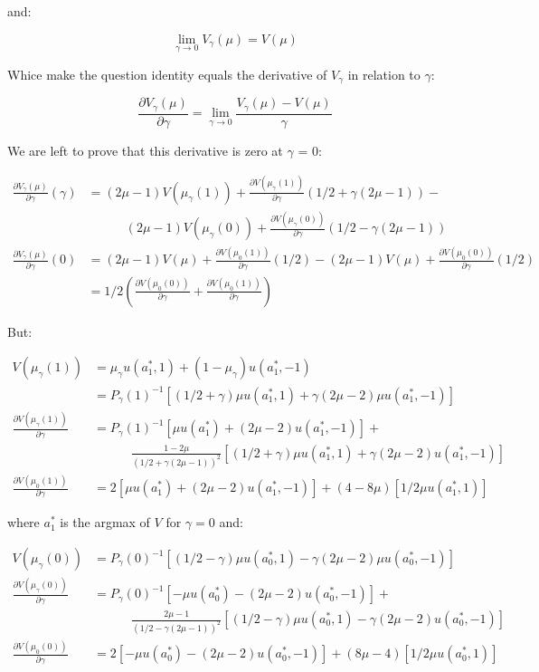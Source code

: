 \documentclass{article}
\begin{document}
and:

\[
  \lim_{\gamma \to 0} V_\gamma(\mu) = V(\mu)
\]

Whice make the question identity equals the derivative of $V_\gamma$ in relation
to $\gamma$:

\[
\frac{\partial V_\gamma(\mu)}{\partial \gamma} =
\lim_{\gamma \to 0} \frac{V_\gamma(\mu) - V(\mu)}{\gamma}
\]

We are left to prove that this derivative is zero at $\gamma$ = 0:

\[
\begin{split}
  \frac{\partial V_\gamma(\mu)}{\partial \gamma}(\gamma) & =
    (2\mu -1)V(\mu_\gamma(1)) +
    \frac{\partial V(\mu_\gamma(1))}{\partial \gamma}(1/2 + \gamma(2\mu - 1)) - \\
    & \qquad\quad
    (2\mu -1)V(\mu_\gamma(0)) +
    \frac{\partial V(\mu_\gamma(0))}{\partial \gamma}(1/2 - \gamma(2\mu - 1)) \\
  \frac{\partial V_\gamma(\mu)}{\partial \gamma}(0) & =
    (2\mu -1)V(\mu) +
    \frac{\partial V(\mu_0(1))}{\partial \gamma}(1/2) -
    (2\mu -1)V(\mu) +
    \frac{\partial V(\mu_0(0))}{\partial \gamma}(1/2) \\
  & =
    1/2 \left(\frac{\partial V(\mu_0(0))}{\partial \gamma} +
      \frac{\partial V(\mu_0(1))}{\partial \gamma}\right)
\end{split}
\]

But:

\[
\begin{split}
  V(\mu_\gamma(1)) & = \mu_\gamma u(a_1^*, 1) + (1 - \mu_\gamma) u(a_1^*, -1) \\
  & = P_\gamma(1)^{-1} 
    [(1/2 + \gamma)\mu u(a_1^*, 1) + \gamma(2\mu - 2)\mu u(a_1^*, -1)] \\
  \frac{\partial V(\mu_\gamma(1))}{\partial \gamma} & = P_\gamma(1)^{-1} 
    [\mu u(a_1^*) + (2\mu - 2)u(a_1^*, -1)] + \\
    & \qquad\quad
    \frac{1 - 2\mu}{(1/2 + \gamma(2\mu -1))^2} 
    [(1/2 + \gamma)\mu u(a_1^*,1) + \gamma(2\mu - 2) u(a_1^*, -1)] \\
  \frac{\partial V(\mu_0(1))}{\partial \gamma} & = 
    2[\mu u(a_1^*) + (2\mu - 2)u(a_1^*, -1)] +
    (4 - 8\mu)[1/2\mu u(a_1^*,1)]
\end{split}
\]

where $a_1^*$ is the argmax of $V$ for $\gamma = 0$ and:

\[
\begin{split}
  V(\mu_\gamma(0)) & =  P_\gamma(0)^{-1} 
    [(1/2 - \gamma)\mu u(a_0^*, 1) - \gamma(2\mu - 2)\mu u(a_0^*, -1)] \\
  \frac{\partial V(\mu_\gamma(0))}{\partial \gamma} & = P_\gamma(0)^{-1} 
    [-\mu u(a_0^*) - (2\mu - 2)u(a_0^*, -1)] + \\
    & \qquad\quad
    \frac{2\mu - 1}{(1/2 - \gamma(2\mu -1))^2}
    [(1/2 - \gamma)\mu u(a_0^*,1) - \gamma(2\mu - 2) u(a_0^*, -1)] \\
  \frac{\partial V(\mu_0(0))}{\partial \gamma} & = 
    2[-\mu u(a_0^*) - (2\mu - 2)u(a_0^*, -1)] +
    (8\mu - 4)[1/2\mu u(a_0^*,1)]
\end{split}
\]
\end{document}
